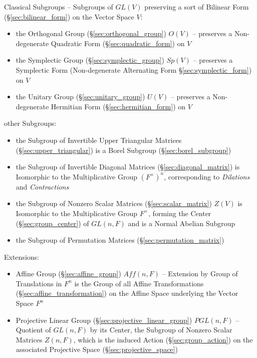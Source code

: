 Classical Subgroups -- Subgroups of $GL(V)$ preserving a sort of Bilinear Form
(\S\ref{sec:bilinear_form}) on the Vector Space $V$:
\begin{itemize}
  \item the Orthogonal Group (\S\ref{sec:orthogonal_group}) $O(V)$ -- preserves
    a Non-degenerate Quadratic Form (\S\ref{sec:quadratic_form}) on $V$
  \item the Symplectic Group (\S\ref{sec:symplectic_group}) $Sp(V)$
    -- preserves a Symplectic Form (Non-degenerate Alternating Form
    \S\ref{sec:symplectic_form}) on $V$
  \item the Unitary Group (\S\ref{sec:unitary_group}) $U(V)$
    -- preserves a Non-degenerate Hermitian Form (\S\ref{sec:hermitian_form})
    on $V$
\end{itemize}

other Subgroups:
\begin{itemize}
  \item the Subgroup of Invertible Upper Triangular Matrices
    (\S\ref{sec:upper_triangular}) is a Borel Subgroup
    (\S\ref{sec:borel_subgroup})
  \item the Subgroup of Invertible Diagonal Matrices
    (\S\ref{sec:diagonal_matrix}) is Isomorphic to the Multiplicative Group
    $(F^\times)^n$, corresponding to \emph{Dilations} and \emph{Contractions}
  \item the Subgroup of Nonzero Scalar Matrices (\S\ref{sec:scalar_matrix})
    $Z(V)$ is Isomorphic to the Multiplicative Group $F^\times$, forming the
    Center (\S\ref{sec:group_center}) of $GL(n,F)$ and is a Normal Abelian
    Subgroup
  \item the Subgroup of Permutation Matrices (\S\ref{sec:permutation_matrix})
\end{itemize}

Extensions:
\begin{itemize}
  \item Affine Group (\S\ref{sec:affine_group}) $Aff(n,F)$ -- Extension by
    Group of Translations in $F^n$ is the Group of all Affine Transformations
    (\S\ref{sec:affine_transformation}) on the Affine Space underlying the
    Vector Space $F^n$
  \item Projective Linear Group (\S\ref{sec:projective_linear_group})
    $PGL(n,F)$ -- Quotient of $GL(n,F)$ by its Center, the Subgroup of Nonzero
    Scalar Matrices $Z(n,F)$, which is the induced Action
    (\S\ref{sec:group_action}) on the associated Projective Space
    (\S\ref{sec:projective_space})
\end{itemize}



